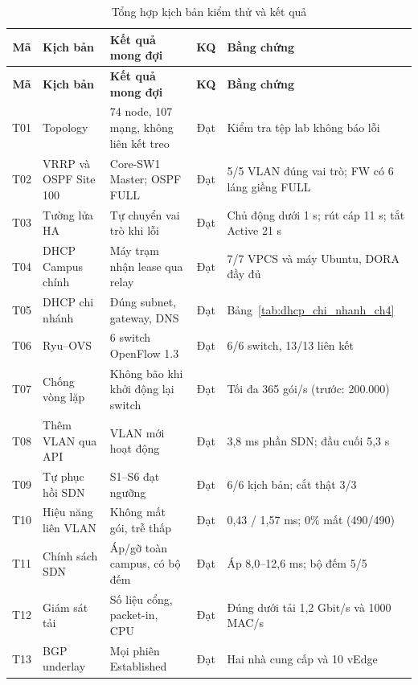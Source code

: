 \begingroup
\small
\setlength{\tabcolsep}{4pt}
\begin{longtable}{|c|L{3.3cm}|L{3.6cm}|c|L{\dimexpr\textwidth-0.9cm-3.3cm-3.6cm-1.1cm-10\arrayrulewidth\relax}|}
    \caption{Tổng hợp kịch bản kiểm thử và kết quả}\label{tab:kiem_thu_tong_hop_ch4} \\
    \hline
    \textbf{Mã} & \textbf{Kịch bản} & \textbf{Kết quả mong đợi} & \textbf{KQ} & \textbf{Bằng chứng} \\
    \hline
    \endfirsthead
    \hline
    \textbf{Mã} & \textbf{Kịch bản} & \textbf{Kết quả mong đợi} & \textbf{KQ} & \textbf{Bằng chứng} \\
    \hline
    \endhead
    \hline
    \endfoot
    T01 & Topology & 74 node, 107 mạng, không liên kết treo & Đạt & Kiểm tra tệp lab không báo lỗi \\
    \hline
    T02 & VRRP và OSPF Site 100 & Core-SW1 Master; OSPF FULL & Đạt & 5/5 VLAN đúng vai trò; FW có 6 láng giềng FULL \\
    \hline
    T03 & Tường lửa HA & Tự chuyển vai trò khi lỗi & Đạt & Chủ động dưới 1 s; rút cáp 11 s; tắt Active 21 s \\
    \hline
    T04 & DHCP Campus chính & Máy trạm nhận lease qua relay & Đạt & 7/7 VPCS và máy Ubuntu, DORA đầy đủ \\
    \hline
    T05 & DHCP chi nhánh & Đúng subnet, gateway, DNS & Đạt & Bảng~\ref{tab:dhcp_chi_nhanh_ch4} \\
    \hline
    T06 & Ryu--OVS & 6 switch OpenFlow 1.3 & Đạt & 6/6 switch, 13/13 liên kết \\
    \hline
    T07 & Chống vòng lặp & Không bão khi khởi động lại switch & Đạt & Tối đa 365 gói/s (trước: 200.000) \\
    \hline
    T08 & Thêm VLAN qua API & VLAN mới hoạt động & Đạt & 3,8 ms phần SDN; đầu cuối 5,3 s \\
    \hline
    T09 & Tự phục hồi SDN & S1--S6 đạt ngưỡng & Đạt & 6/6 kịch bản; cắt thật 3/3 \\
    \hline
    T10 & Hiệu năng liên VLAN & Không mất gói, trễ thấp & Đạt & 0,43 / 1,57 ms; 0\% mất (490/490) \\
    \hline
    T11 & Chính sách SDN & Áp/gỡ toàn campus, có bộ đếm & Đạt & Áp 8,0--12,6 ms; bộ đếm 5/5 \\
    \hline
    T12 & Giám sát tải & Số liệu cổng, packet-in, CPU & Đạt & Đúng dưới tải 1,2 Gbit/s và 1000 MAC/s \\
    \hline
    T13 & BGP underlay & Mọi phiên Established & Đạt & Hai nhà cung cấp và 10 vEdge \\

\end{longtable}
